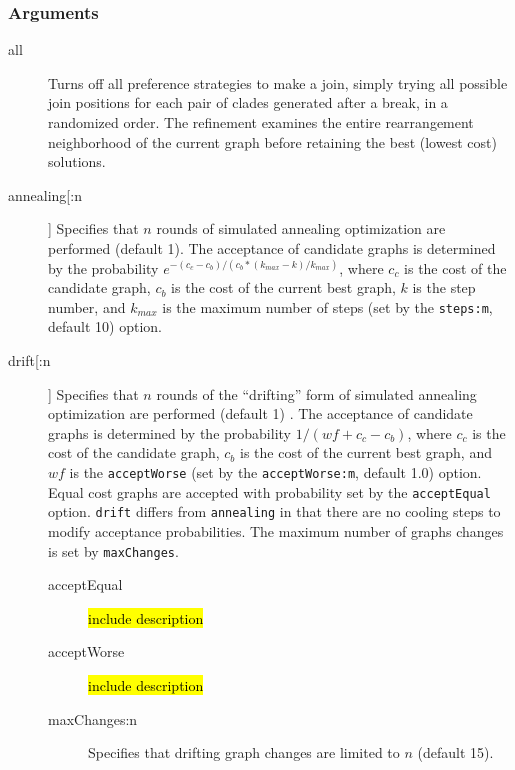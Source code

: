 	\subsubsection{Arguments}
		\begin{description}
			\item[all]  Turns off all preference strategies to make a join, simply trying all possible 
			join positions for each pair of clades generated after a break, in a randomized order. 
			The refinement examines the entire rearrangement neighborhood of the current graph 
			before retaining the best (lowest cost) solutions.
		
			\item[annealing[:n]] Specifies that $n$ rounds of simulated annealing \citep{Metropolisetal1953, 
			Kirkpatricketal1983, Cerny1985} optimization are performed (default 1). The acceptance 
			of candidate graphs is determined by the probability $e ^ {- (c_c - c_b)/ (c_b * (k_{max} -k)/ k_{max})}$, 
			where $c_c$ is the cost of the candidate graph, $c_b$ is the cost of the current best graph, $k$ 
			is the step number, and $k_{max}$ is the maximum number of steps (set by the \texttt{steps:m}, 
			default 10) option.
		
			\item[drift[:n]] Specifies that $n$ rounds of the ``drifting'' form of simulated annealing 
			\citep{goloboff1999} optimization are performed (default 1) . The acceptance of candidate 
			graphs is determined by the probability $1/ (wf + c_c - c_b)$, where $c_c$ is the cost 
			of the candidate graph, $c_b$ is the cost of the current best graph, and $wf$ is the 
			\texttt{acceptWorse} (set by the \texttt{acceptWorse:m}, default 1.0) option. Equal 
			cost graphs are accepted with probability set by the \texttt{acceptEqual}  option. 
			\texttt{drift} differs from \texttt{annealing} in that there are no cooling steps to modify 
			acceptance probabilities. The maximum number of graphs changes is set by 
			\texttt{maxChanges}.
			
			\begin{description}
			
			\item[acceptEqual] \hl{include description}
			
			\item[acceptWorse] \hl{include description}
			
			\item[maxChanges:n] Specifies that drifting graph changes are limited to $n$ (default 15).
			

\end{description}
\end{description}
